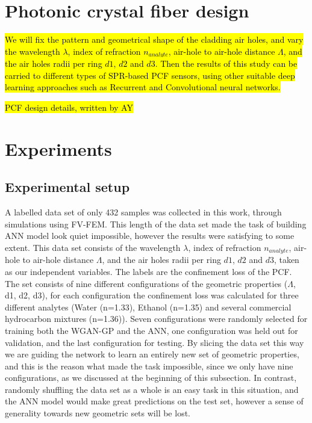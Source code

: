 \documentclass[draft, 10pt]{IEEEtran}
\begin{document}
\section{Photonic crystal fiber design}
\label{sec:pcf}


\hl{We will fix the pattern and geometrical shape of the cladding air holes, and vary the wavelength $\lambda$, index of refraction $n_{analyte} $, air-hole to air-hole distance $ \Lambda $, and the air holes radii per ring $d1$, $d2$ and $d3$. Then the results of this study can be carried to different types of SPR-based PCF sensors, using other suitable deep learning approaches such as Recurrent and Convolutional neural networks. }

\hl{PCF design details, written by AY}

\section{Experiments}
\label{sec:exp}

\subsection{Experimental setup}

A labelled data set of only 432 samples was collected in this work, through simulations using FV-FEM. This length of the data set made the task of building ANN model look quiet impossible, however the results were satisfying to some extent. This data set consists of the wavelength $\lambda$, index of refraction $n_{analyte} $, air-hole to air-hole distance $ \Lambda $, and the air holes radii per ring $d1$, $d2$ and $d3$, taken as our independent variables. The labels are the confinement loss of the PCF. The set consists of nine different configurations of the geometric properties ($ \Lambda $, d1, d2, d3), for each configuration the confinement loss was calculated for three different analytes (Water (n=1.33), Ethanol (n=1.35) and several commercial hydrocarbon mixtures (n=1.36)). Seven configurations were randomly selected for training both the WGAN-GP and the ANN, one configuration was held out for validation, and the last configuration for testing. By slicing the data set this way we are guiding the network to learn an entirely new set of geometric properties, and this is the reason what made the task impossible, since we only have nine configurations, as we discussed at the beginning of this subsection. In contrast, randomly shuffling the data set as a whole is an easy task in this situation, and the ANN model would make great predictions on the test set, however a sense of generality towards new geometric sets will be lost.
\end{document}
